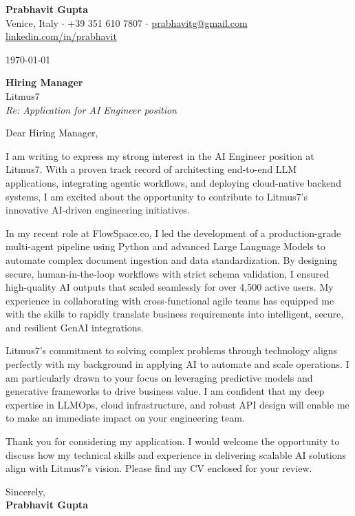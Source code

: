 \documentclass[11pt,a4paper]{article}
\begin{document}
\noindent
\textbf{\Large Prabhavit Gupta} \\
Venice, Italy $\cdot$ +39 351 610 7807 $\cdot$ \href{mailto:prabhavitg@gmail.com}{prabhavitg@gmail.com} \\
\href{https://www.linkedin.com/in/prabhavit/}{linkedin.com/in/prabhavit}

\vspace{2em}
\noindent
\today

\vspace{1em}
\noindent
\textbf{Hiring Manager} \\
Litmus7 \\
\textit{Re: Application for AI Engineer position}

\vspace{1em}
\noindent
Dear Hiring Manager,

\vspace{1em}
\noindent
I am writing to express my strong interest in the AI Engineer position at Litmus7. With a proven track record of architecting end-to-end LLM applications, integrating agentic workflows, and deploying cloud-native backend systems, I am excited about the opportunity to contribute to Litmus7's innovative AI-driven engineering initiatives.

\vspace{1em}
\noindent
In my recent role at FlowSpace.co, I led the development of a production-grade multi-agent pipeline using Python and advanced Large Language Models to automate complex document ingestion and data standardization. By designing secure, human-in-the-loop workflows with strict schema validation, I ensured high-quality AI outputs that scaled seamlessly for over 4,500 active users. My experience in collaborating with cross-functional agile teams has equipped me with the skills to rapidly translate business requirements into intelligent, secure, and resilient GenAI integrations.

\vspace{1em}
\noindent
Litmus7's commitment to solving complex problems through technology aligns perfectly with my background in applying AI to automate and scale operations. I am particularly drawn to your focus on leveraging predictive models and generative frameworks to drive business value. I am confident that my deep expertise in LLMOps, cloud infrastructure, and robust API design will enable me to make an immediate impact on your engineering team. 

\vspace{1em}
\noindent
Thank you for considering my application. I would welcome the opportunity to discuss how my technical skills and experience in delivering scalable AI solutions align with Litmus7's vision. Please find my CV enclosed for your review.

\vspace{2em}
\noindent
Sincerely, \\
\vspace{1em}
\textbf{Prabhavit Gupta}
\end{document}
